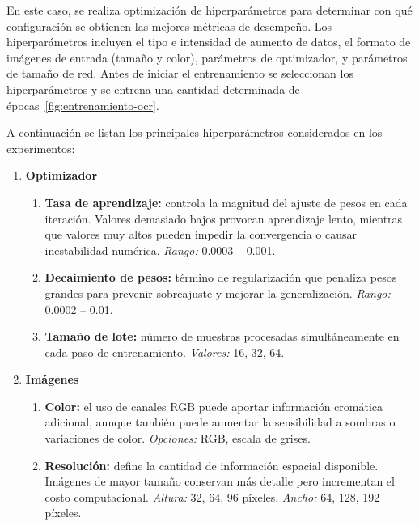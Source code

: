 En este caso, se realiza optimización de hiperparámetros para determinar con qué configuración 
se obtienen las mejores métricas de desempeño. Los hiperparámetros incluyen el tipo e
intensidad de aumento de datos, el formato de imágenes de entrada (tamaño y color),
parámetros de optimizador, y parámetros de tamaño de red.
Antes de iniciar el entrenamiento se seleccionan los hiperparámetros y se entrena 
una cantidad determinada de épocas~\ref{fig:entrenamiento-ocr}.

A continuación se listan los principales hiperparámetros considerados en los experimentos:
\begin{enumerate}
	\item \textbf{Optimizador}
	\begin{enumerate}
		\item \textbf{Tasa de aprendizaje:} controla la magnitud del ajuste de pesos en cada iteración.
		Valores demasiado bajos provocan aprendizaje lento, mientras que valores muy altos
		pueden impedir la convergencia o causar inestabilidad numérica.  
		\textit{Rango: } 0.0003 -- 0.001.
		\item \textbf{Decaimiento de pesos:} término de regularización que penaliza pesos grandes
		para prevenir sobreajuste y mejorar la generalización.  
		\textit{Rango: } 0.0002 -- 0.01.
		\item \textbf{Tamaño de lote:} número de muestras procesadas simultáneamente en cada paso de entrenamiento.
		\textit{Valores: } 16, 32, 64.
	\end{enumerate}

	\item \textbf{Imágenes}
	\begin{enumerate}
		\item \textbf{Color:} el uso de canales RGB puede aportar información cromática adicional,
		aunque también puede aumentar la sensibilidad a sombras o variaciones de color.
		\textit{Opciones: } RGB, escala de grises.
		\item \textbf{Resolución:} define la cantidad de información espacial disponible.
		Imágenes de mayor tamaño conservan más detalle pero incrementan el costo computacional.  
		\textit{Altura: } 32, 64, 96 píxeles.  
		\textit{Ancho: } 64, 128, 192 píxeles.
	\end{enumerate}


\end{enumerate}

